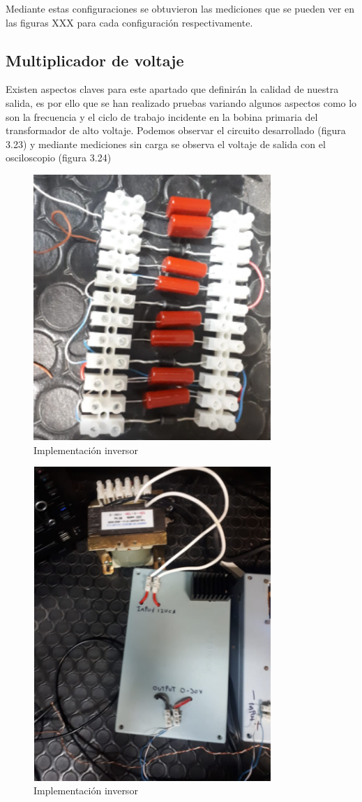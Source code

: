 Mediante estas configuraciones se obtuvieron las mediciones que se pueden ver en las figuras XXX para cada configuración respectivamente. 

\subsection{Multiplicador de voltaje}

Existen aspectos claves para este apartado que definirán la calidad de nuestra salida, es por ello que se han realizado pruebas variando algunos aspectos como lo son la frecuencia y el ciclo de trabajo incidente en la bobina primaria del transformador de alto voltaje. Podemos observar el circuito desarrollado (figura 3.23) y mediante mediciones sin carga se observa el voltaje de salida con el osciloscopio (figura 3.24)

\begin{figure}[H]
\centering
\includegraphics[width=9cm]{Capitulo3/figs/fotomulti.png}
\caption{Implementación inversor}
\end{figure}

\begin{figure}[H]
\centering
\includegraphics[width=9cm]{Capitulo3/figs/fotofuente.png}
\caption{Implementación inversor}
\end{figure}
